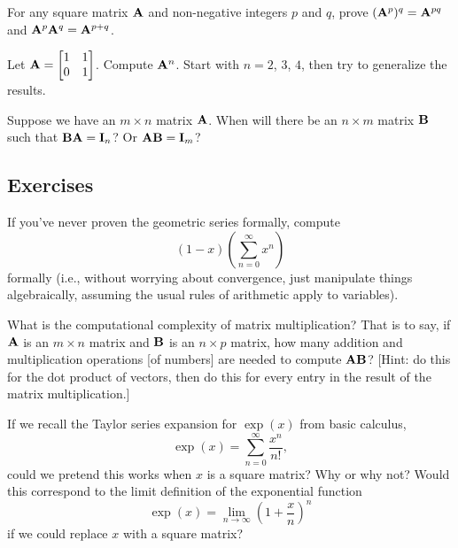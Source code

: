 \begin{problem}
  For any square matrix $\mathbf{A}$ and non-negative integers $p$ and $q$,
  prove $(\mathbf{A}^{p})^{q} = \mathbf{A}^{pq}$
  and $\mathbf{A}^{p}\mathbf{A}^{q}=\mathbf{A}^{p+q}$.
\end{problem}

\begin{problem}
Let $\displaystyle\mathbf{A}=\begin{bmatrix}1 & 1\\0 & 1 \end{bmatrix}$.
Compute $\mathbf{A}^{n}$. Start with $n=2$, $3$, $4$, then try to
generalize the results.
\end{problem}

Suppose we have an $m\times n$ matrix $\mathbf{A}$. When will there be an
$n\times m$ matrix $\mathbf{B}$ such that $\mathbf{B}\mathbf{A}=\mathbf{I}_{n}$? Or
$\mathbf{A}\mathbf{B}=\mathbf{I}_{m}$?

\subsection*{Exercises}

\begin{exercise}
  If you've never proven the geometric series formally, compute
  \[ (1 - x)\left(\sum^{\infty}_{n=0}x^{n}\right)\]
  formally (i.e., without worrying about convergence, just manipulate
  things algebraically, assuming the usual rules of arithmetic apply to variables).
\end{exercise}

\begin{exercise}
What is the computational complexity of matrix multiplication?
That is to say, if $\mathbf{A}$ is an $m\times n$ matrix and $\mathbf{B}$ is an
$n\times p$ matrix, how many addition and multiplication operations [of
  numbers] are needed to compute $\mathbf{A}\mathbf{B}$? [Hint: do this for
  the dot product of vectors, then do this for every entry in the result
  of the matrix multiplication.]
\end{exercise}

\begin{exercise}
If we recall the Taylor series expansion for $\exp(x)$ from basic
calculus,
\[ \exp(x) = \sum^{\infty}_{n=0}\frac{x^{n}}{n!}, \]
could we pretend this works when $x$ is a square matrix? Why or why not?
Would this correspond to the limit definition of the exponential
function
\[ \exp(x) = \lim_{n\to\infty}\left(1 + \frac{x}{n}\right)^{n} \]
if we could replace $x$ with a square matrix?
\end{exercise}


